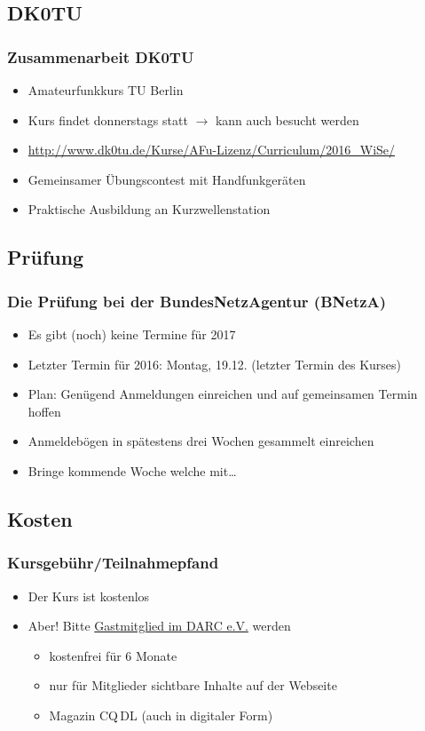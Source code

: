 \subsection{DK0TU}

\begin{frame}
  \frametitle{Zusammenarbeit DK0TU}
  \begin{itemize}
    \item Amateurfunkkurs TU Berlin
    \item Kurs findet donnerstags statt $\rightarrow$ kann auch besucht werden
    \item \ExternalLink\url{http://www.dk0tu.de/Kurse/AFu-Lizenz/Curriculum/2016_WiSe/}
    \item Gemeinsamer Übungscontest mit Handfunkgeräten
    \item Praktische Ausbildung an Kurzwellenstation
  \end{itemize}
\end{frame}


\subsection{Prüfung}

\begin{frame}
  \frametitle{Die Prüfung bei der BundesNetzAgentur (BNetzA)}

  \begin{itemize}
    \item Es gibt (noch) keine Termine für 2017
    \item Letzter Termin für 2016: Montag, 19.12. (letzter Termin des Kurses)
    \item Plan: Genügend Anmeldungen einreichen und auf gemeinsamen Termin hoffen
    \item Anmeldebögen in spätestens drei Wochen gesammelt einreichen
    \item Bringe kommende Woche welche mit\ldots
  \end{itemize}
\end{frame}


\subsection{Kosten}

\begin{frame}
  \frametitle{Kursgebühr/Teilnahmepfand}

  \begin{itemize}
    \item Der Kurs ist kostenlos
    \item Aber! Bitte \href{https://www.darc.de/der-club/mitgliedschaft/}{\ExternalLink Gastmitglied im DARC e.V.} werden
      \begin{itemize}
        \item kostenfrei für 6 Monate
        \item nur für Mitglieder sichtbare Inhalte auf der Webseite
        \item Magazin CQ\,DL (auch in digitaler Form)
      \end{itemize}
  \end{itemize}
\end{frame}

